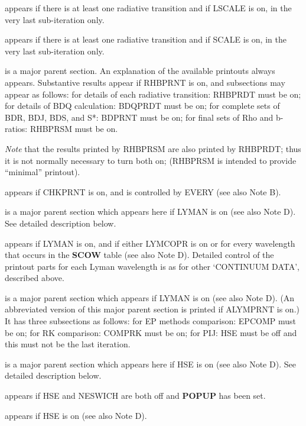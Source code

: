 appears if there is at least one radiative transition and if LSCALE
is on, in the very last sub-iteration only.
\blankline
{} \par
appears if there is at least one radiative transition and if SCALE
is on, in the very last sub-iteration only.
\blankline
{} \par
is a major parent section. An explanation of the available printouts
always appears. Substantive results appear if
RHBPRNT is on, and subsections may appear as follows:
\bull for details of each radiative transition: RHBPRDT must be on;
\bull for details of BDQ calculation: BDQPRDT must be on;
\bull for complete sets of BDR, BDJ, BDS, and S*: BDPRNT must be on;
\bull for final sets of Rho and b-ratios: RHBPRSM must be on. \par
{\it Note} that the results printed by RHBPRSM are also printed by RHBPRDT;
thus it is not normally necessary to turn both on; (RHBPRSM is intended
to provide ``minimal'' printout).
\blankline
{} \par
appears if CHKPRNT is on, and is controlled by EVERY (see also Note B).
\ej
{} \par
is a major parent section which appears here if LYMAN is on (see also Note D).
See detailed description below.
\blankline
{} \par
appears if LYMAN is on, and if either LYMCOPR is on or for every
wavelength that occurs in the {\bf SCOW} table
(see also Note D). Detailed control of the printout parts for each
Lyman wavelength is as for other `CONTINUUM DATA', described above.
\blankline
{} \par
is a major parent section which appears if LYMAN is on (see also
Note D). (An abbreviated version of this major parent section is printed
if ALYMPRNT is on.) It has three subsections as follows:
\bull for EP methods comparison: EPCOMP must be on;
\bull for RK comparison: COMPRK must be on;
\bull for PIJ: HSE must be off and this must not be the last
iteration.
\blankline
{} \par
is a major parent section which appears here if HSE is on (see also Note D).
See detailed description below.
\blankline
{} \par
appears if HSE and NESWICH are both off and {\bf POPUP} has been
set.
\blankline
{} \par
appears if HSE is on (see also Note D).
